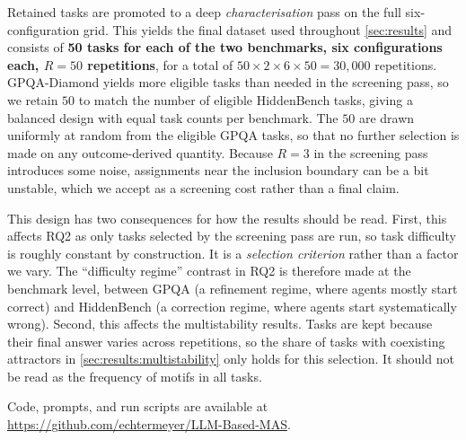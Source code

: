 Retained tasks are promoted to a deep \emph{characterisation} pass on the full
six-configuration grid. This yields the final dataset used throughout
\autoref{sec:results} and consists of \textbf{50 tasks for each of the two benchmarks, six
configurations each, $R = 50$ repetitions}, for a total of
$50 \times 2 \times 6 \times 50 = 30{,}000$ repetitions.
GPQA-Diamond yields more eligible tasks than needed in the screening pass, so we
retain $50$ to match the number of eligible HiddenBench tasks, giving a balanced
design with equal task counts per benchmark. The $50$ are drawn uniformly at
random from the eligible GPQA tasks, so that no further selection is made on any
outcome-derived quantity. Because $R = 3$ in the screening pass introduces some
noise, assignments near the inclusion boundary can be a bit unstable, which we
accept as a screening cost rather than a final claim.

This design has two consequences for how the results should be read.
First, this affects RQ2 as only tasks selected by the screening pass are run, so task difficulty
is roughly constant by construction. It is a \emph{selection criterion} rather
than a factor we vary. The ``difficulty regime'' contrast in RQ2 is therefore
made at the benchmark level, between GPQA (a refinement regime, where agents mostly
start correct) and HiddenBench (a correction regime, where agents start systematically
wrong).
Second, this affects the multistability results. Tasks are kept because their final answer varies across
repetitions, so the share of tasks with coexisting attractors in
\autoref{sec:results:multistability} only holds for this selection. It should not be
read as the frequency of motifs in all tasks.

Code, prompts, and run scripts are
available at \url{https://github.com/echtermeyer/LLM-Based-MAS}.
